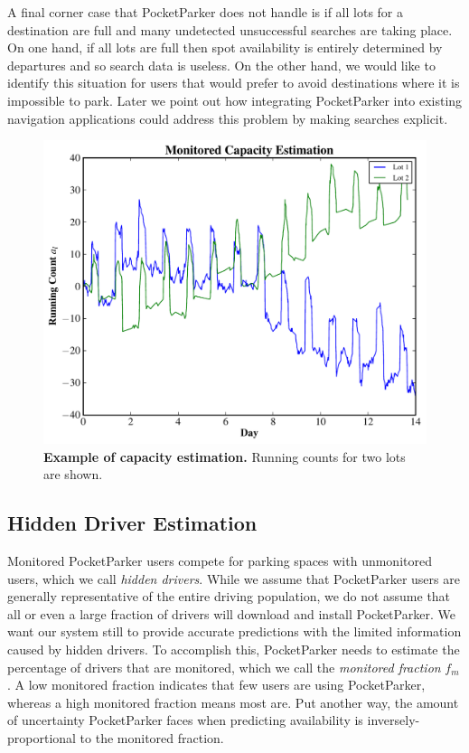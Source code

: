A final corner case that PocketParker does not handle is if all lots for a
destination are full and many undetected unsuccessful searches are taking
place. On one hand, if all lots are full then spot availability is entirely
determined by departures and so search data is useless. On the other hand, we
would like to identify this situation for users that would prefer to avoid
destinations where it is impossible to park. Later we point out how
integrating PocketParker into existing navigation applications could address
this problem by making searches explicit.

\begin{figure}
\centering
\includegraphics[width=\columnwidth]{./simulator/figures/capacity.pdf}

\caption{\textbf{Example of capacity estimation.} Running counts for two lots
are shown.}

\vspace*{-0.2in}
\label{fig-capacityexample}
\end{figure}

\subsection{Hidden Driver Estimation}

Monitored PocketParker users compete for parking spaces with unmonitored
users, which we call \textit{hidden drivers}. While we assume that
PocketParker users are generally representative of the entire driving
population, we do not assume that all or even a large fraction of drivers
will download and install PocketParker. We want our system still to provide
accurate predictions with the limited information caused by hidden drivers.
To accomplish this, PocketParker needs to estimate the percentage of drivers
that are monitored, which we call the \textit{monitored fraction} $f_m$. A
low monitored fraction indicates that few users are using PocketParker,
whereas a high monitored fraction means most are. Put another way, the amount
of uncertainty PocketParker faces when predicting availability is
inversely-proportional to the monitored fraction.

